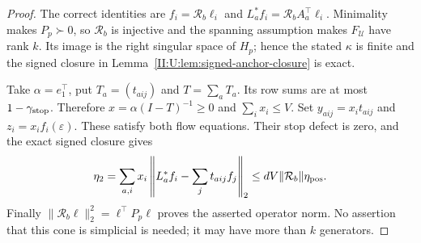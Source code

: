 \begin{proof}
The correct identities are
$f_i=\mathcal R_b\ell_i$ and
$L_a^*f_i=\mathcal R_bA_a^\top\ell_i$.
Minimality makes $P_p\succ0$, so $\mathcal R_b$ is injective and
the spanning assumption makes $F_{\mathcal U}$ have rank $k$.
Its image is the right singular space of $H_p$; hence the stated
$\kappa$ is finite and the signed closure in
Lemma~\ref{II:U:lem:signed-anchor-closure} is exact.

Take $\alpha=e_1^\top$, put $T_a=(t_{aij})$ and $T=\sum_aT_a$. Its row sums are at most
$1-\gamma_{\rm stop}$. Therefore
$x=\alpha(I-T)^{-1}\ge0$ and $\sum_i x_i\le V$.
Set $y_{aij}=x_it_{aij}$ and $z_i=x_if_i(\varepsilon)$.
These satisfy both flow equations. Their stop defect is zero, and
the exact signed closure gives
\[
 \eta_2=\sum_{a,i}x_i
 \left\|L_a^*f_i-\sum_jt_{aij}f_j\right\|_2
 \le dV\|\mathcal R_b\|\eta_{\rm pos}.
\]
Finally $\|\mathcal R_b\ell\|_2^2=\ell^\top P_p\ell$ proves
the asserted operator norm. No assertion that this cone is simplicial
is needed; it may have more than $k$ generators.
\end{proof}
